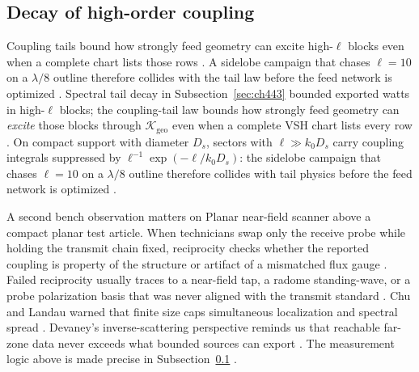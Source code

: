 \subsection{Decay of high-order coupling}
\label{sec:ch463}
Coupling tails bound how strongly feed geometry can excite high-$\ell$ blocks even when a complete chart lists those rows \cite{hansen1988}. A sidelobe campaign that chases $\ell=10$ on a $\lambda/8$ outline therefore collides with the tail law before the feed network is optimized \cite{stratton1941}.
Spectral tail decay in Subsection~\ref{sec:ch443} bounded exported watts in high-$\ell$ blocks; the coupling-tail law bounds how strongly feed geometry can \emph{excite} those blocks through $\boldsymbol{\mathcal{K}}_{\mathrm{geo}}$ even when a complete VSH chart lists every row \cite{hansen1988}. On compact support with diameter $D_s$, sectors with $\ell\gg k_0 D_s$ carry coupling integrals suppressed by $\ell^{-1}\exp(-\ell/k_0 D_s)$: the sidelobe campaign that chases $\ell=10$ on a $\lambda/8$ outline therefore collides with tail physics before the feed network is optimized \cite{chu1948}.
\begin{physicalvignette}
A second bench observation matters on Planar near-field scanner above a compact planar test article. When technicians swap only the receive probe while holding the transmit chain fixed, reciprocity checks whether the reported coupling is property of the structure or artifact of a mismatched flux gauge \cite{stratton1941}. Failed reciprocity usually traces to a near-field tap, a radome standing-wave, or a probe polarization basis that was never aligned with the transmit standard \cite{hansen1988}.
Chu and Landau warned that finite size caps simultaneous localization and spectral spread \cite{chu1948}. Devaney's inverse-scattering perspective reminds us that reachable far-zone data never exceeds what bounded sources can export \cite{devaney2004}.
The measurement logic above is made precise in Subsection~\ref{sec:ch463} \cite{stratton1941}.
\end{physicalvignette}
